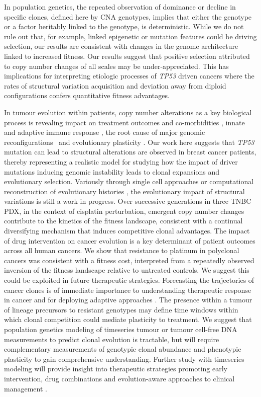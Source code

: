 In population genetics, the repeated observation of dominance or decline in specific clones, defined here by CNA genotypes, implies that either the genotype or a factor heritably linked to the genotype, is deterministic. 
While we do not rule out that, for example, linked epigenetic or mutation features could be driving selection, our results are consistent with changes in the genome architecture linked to increased fitness.  
Our results suggest that positive selection attributed to copy number changes of all scales may be under-appreciated. This has implications for interpreting etiologic processes of \textit{TP53} driven cancers where the rates of structural variation acquisition and deviation away from diploid configurations confers quantitative fitness advantages.

In tumour evolution within patients, copy number alterations as a key biological process is revealing impact on treatment outcomes and co-morbidities \cite{Bielski2018-cm}, innate and adaptive immune response \cite{Bakhoum2018-ko,Davoli2017-mf}, the root cause of major genomic reconfigurations~\cite{Umbreit2020-ls} and evolutionary plasticity \cite{Lopez2020-ku}. 
Our work here suggests that \textit{TP53} mutation can lead to structural alterations are observed in breast cancer patients, thereby representing a realistic model for studying how the impact of driver mutations inducing genomic instability leads to clonal expansions and evolutionary selection. Variously through single cell approaches \cite{gao2016punctuated} or computational reconstruction of evolutionary histories \cite{Gerstung2020-jl}, the evolutionary impact of structural variations is still a work in progress. Over successive generations in three TNBC PDX, in the context of cisplatin perturbation, emergent copy number changes contribute to the kinetics of the fitness landscape, consistent with a continual diversifying mechanism that induces competitive clonal advantages.  
The impact of drug intervention on cancer evolution is a key determinant of patient outcomes across all human cancers.  
We show that resistance to platinum in polyclonal cancers was consistent with a fitness cost, interpreted from a repeatedly observed inversion of the fitness landscape relative to untreated controls. We suggest this could be exploited in future therapeutic strategies. Forecasting the trajectories of cancer clones is of immediate importance to understanding therapeutic response in cancer and for deploying adaptive approaches \cite{Vasan2019-mt}. The presence within a tumour of lineage precursors to resistant genotypes may define time windows within which clonal competition could mediate plasticity to treatment. We suggest that population genetics modeling of timeseries tumour or tumour cell-free DNA measurements to predict clonal evolution is tractable, but will require complementary measurements of genotypic clonal abundance and phenotypic plasticity to gain comprehensive understanding. Further study with timeseries modeling will provide insight into therapeutic strategies promoting early intervention, drug combinations and evolution-aware approaches to clinical management \cite{Acar2020-tf}.

